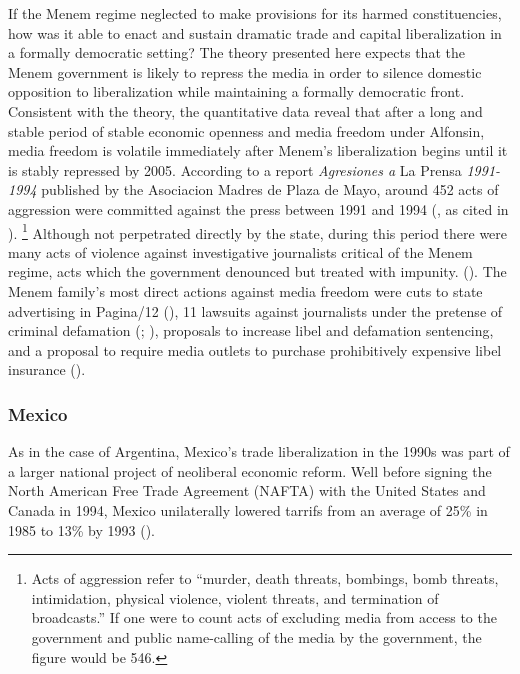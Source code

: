 \documentclass[12pt]{report}
\begin{document}
If the Menem regime neglected to make provisions for its harmed constituencies, how was it able to
enact and sustain dramatic trade and capital liberalization in a formally democratic setting? The
theory presented here expects that the Menem government is likely to repress the media in order to
silence domestic opposition to liberalization while maintaining a formally democratic front.
Consistent with the theory, the quantitative data reveal that after a long and stable period of
stable economic openness and media freedom under Alfonsin, media freedom is volatile immediately
after Menem's liberalization begins until it is stably repressed by 2005. According to a report
\emph{Agresiones a }La Prensa\emph{ 1991-1994} published by the Asociacion Madres de Plaza de Mayo,
around 452 acts of aggression were committed against the press between 1991 and 1994
(\citealt{Delgado:1995tr}, as cited in \citealt[247]{Park:2002io}). \footnote{Acts of aggression
refer to ``murder, death threats, bombings, bomb threats, intimidation, physical violence, violent
threats, and termination of broadcasts.'' If one were to count acts of excluding media from access
to the government and public name-calling of the media by the government, the figure would be 546.
} Although not perpetrated directly by the state, during this period there were many acts of
violence against investigative journalists critical of the Menem regime, acts which the government
denounced but treated with impunity. (\citealt{Long:1993wb}). The Menem family's most direct actions
against media freedom were cuts to state advertising in Pagina/12 (\citealt[27]{Waisbord:1994kq}),
11 lawsuits against journalists under the pretense of criminal defamation
(\citealt{McCullough:1991cs}; \citealt{Anonymous:TKNgfiRX}), proposals to increase libel and
defamation sentencing, and a proposal to require media outlets to purchase prohibitively expensive
libel insurance (\citealt{Sims:kgMPqAHd}).

\subsubsection{Mexico}

As in the case of Argentina, Mexico's trade liberalization in the 1990s was part of a larger
national project of neoliberal economic reform. Well before signing the North American Free Trade
Agreement (NAFTA) with the United States and Canada in 1994, Mexico unilaterally lowered tarrifs
from an average of 25\% in 1985 to 13\% by 1993 (\citealt{McDaniel:2003kw}).
\end{document}
